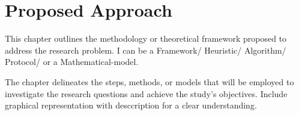 \chapter{Proposed Approach }

This chapter outlines the methodology or theoretical framework proposed to address the research problem. I can be a Framework/ Heuristic/ Algorithm/ Protocol/ or a Mathematical-model.

The chapter delineates the steps, methods, or models that will be employed to investigate the research questions and achieve the study's objectives. Include graphical representation with desccription for a clear understanding.